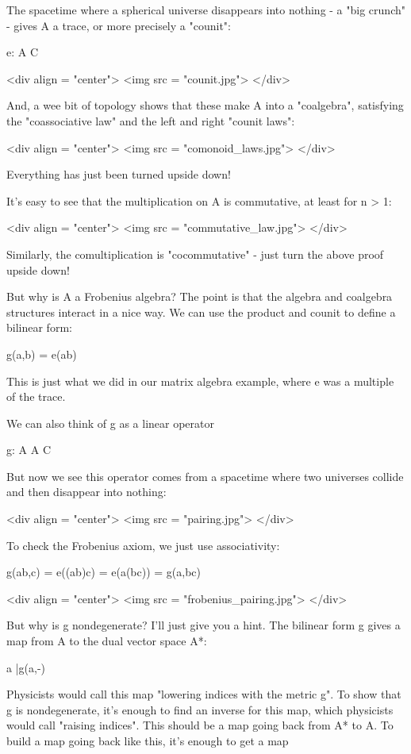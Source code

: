 The spacetime where a spherical universe disappears into nothing -
a "big crunch" - gives A a trace, or more precisely a "counit":

e: A \to  C

<div align = "center">
<img src = "counit.jpg">
</div>

And, a wee bit of topology shows that these make A into a
"coalgebra", satisfying the "coassociative law"
and the left and right "counit laws":

<div align = "center">
<img src = "comonoid_laws.jpg">
</div>

Everything has just been turned upside down!

It's easy to see that the multiplication on A is commutative, 
at least for n > 1:

<div align = "center">
<img src = "commutative_law.jpg">
</div>

Similarly, the comultiplication is "cocommutative" - just
turn the above proof upside down!

But why is A a Frobenius algebra?  The point is that the algebra
and coalgebra structures interact in a nice way.  We can use the 
product and counit to define a bilinear form:

g(a,b) = e(ab)

This is just what we did in our matrix algebra example, where e
was a multiple of the trace.                  

We can also think of g as a linear operator 

g: A \otimes  A \to  C

But now we see this operator comes from a spacetime where two 
universes collide and then disappear into nothing:

<div align = "center">
<img src = "pairing.jpg">
</div>
               
           
To check the Frobenius axiom, we just use associativity:

g(ab,c) = e((ab)c) = e(a(bc)) = g(a,bc)

<div align = "center">
<img src = "frobenius_pairing.jpg">
</div>

But why is g nondegenerate?  I'll just give you a hint.  
The bilinear form g gives a map from A to the dual vector space A*:

a |\to  g(a,-)

Physicists would call this map "lowering indices with the metric
g".  To show that g is nondegenerate, it's enough to find an
inverse for this map, which physicists would call "raising
indices".  This should be a map going back from A* to A.  To
build a map going back like this, it's enough to get a map

